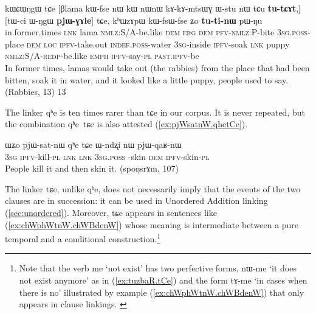 \documentclass[oldfontcommands,oneside,a4paper,11pt]{article}
\newcommand{\ipa}[1]{{\phon \mbox{#1}}} %
\newcommand{\refb}[1]{(\ref{#1})}
\begin{document}
\begin{exe}
\ex \label{ex:pWNu2}
\gll
\ipa{kɯɕɯŋgɯ}  	\ipa{tɕe}  	[\ipa{βlama}  	\ipa{kɯ-fse}  	\ipa{nɯ}  	\ipa{kɯ}  	\ipa{nɯnɯ}  	\ipa{kɤ-kɤ-mtsɯɣ}  	\ipa{ɯ-stu}  	\ipa{nɯ}  	\ipa{tɕu}  	\ipa{\textbf{tu-tɕɤt},}]  	[\ipa{tɯ-ci}  	\ipa{ɯ-ŋgɯ}  	\ipa{\textbf{pjɯ-ɣɤle}}]  	\ipa{tɕe,}  	\ipa{kʰɯzɤpɯ}  	\ipa{kɯ-fsɯ-fse}  	\ipa{ʑo}  	\textbf{\ipa{tu-ti-nɯ}}  	\ipa{pɯ-ŋu}  \\
in.former.times \textsc{lnk} lama \textsc{nmlz}:S/A-be.like \textsc{dem} \textsc{erg}  \textsc{dem} \textsc{pfv-nmlz:P}-bite \textsc{3sg.poss}-place \textsc{dem} \textsc{loc} \textsc{ipfv}-take.out \textsc{indef.poss}-water \textsc{3sg}-inside \textsc{ipfv}-soak \textsc{lnk} puppy \textsc{nmlz:S/A-redp}-be.like \textsc{emph} \textsc{ipfv}-say-\textsc{pl} \textsc{past.ipfv}-be \\
\glt In former times, lamas would take out (the rabbies) from the place that had been bitten, soak it in water, and it looked like a little puppy, people used to say. (Rabbies, 13)
13
  \end{exe}  

The linker \ipa{qʰe} is ten times rarer than \ipa{tɕe} in our corpus. It is  never repeated, but the combination \ipa{qʰe tɕe} is also attested \refb{ex:pjWsatnW.qhetCe}.

\begin{exe}
\ex \label{ex:pjWsatnW.qhetCe}
\gll 
\ipa{ɯʑo}  	\ipa{pjɯ-sat-nɯ}  	\ipa{qʰe}  	\ipa{tɕe}  	\ipa{ɯ-ndʐi}  	\ipa{nɯ}  	\ipa{pjɯ-qaʁ-nɯ}  \\
\textsc{3sg} \textsc{ipfv}-kill-\textsc{pl} \textsc{lnk}  \textsc{lnk} \textsc{3sg.poss }-skin \textsc{dem} \textsc{ipfv}-skin-\textsc{pl} \\
\glt People kill it and then skin it. (spoŋsrɤm, 107)
\end{exe}

 The linker \ipa{tɕe}, unlike \ipa{qʰe},  does not necessarily imply that the events of the two clauses are in succession: it can be used in Unordered Addition linking \refb{sec:unordered}. Moreover,  \ipa{tɕe}  appears in sentences like \refb{ex:chWphWtnW.chWBdenW} whose meaning is intermediate between a pure temporal and a conditional construction.\footnote{Note that the verb \ipa{me} `not exist' has two perfective forms,  \ipa{nɯ-me} `it does not exist anymore' as in \refb{ex:tuzbaR.tCe} and the   form \ipa{tɤ-me} `in cases when there is no' illustrated by example \refb{ex:chWphWtnW.chWBdenW} that only appears in clause linkings. \label{ft:tAme}}
\end{document}
